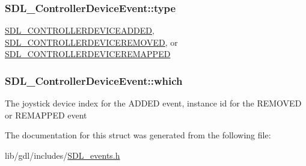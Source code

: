 \subsubsection[{type}]{ S\+D\+L\+\_\+\+Controller\+Device\+Event\+::type}\label{struct_s_d_l___controller_device_event_a45b3807eaf70a5f5cf712455da277536}
\hyperlink{_s_d_l__events_8h_a3b589e89be6b35c02e0dd34a55f3fccaa9642de478348da1aba4fb5791e8c5314}{S\+D\+L\+\_\+\+C\+O\+N\+T\+R\+O\+L\+L\+E\+R\+D\+E\+V\+I\+C\+E\+A\+D\+D\+E\+D}, \hyperlink{_s_d_l__events_8h_a3b589e89be6b35c02e0dd34a55f3fccaae00ac6995dfb7b92bfae68b9f47ae07a}{S\+D\+L\+\_\+\+C\+O\+N\+T\+R\+O\+L\+L\+E\+R\+D\+E\+V\+I\+C\+E\+R\+E\+M\+O\+V\+E\+D}, or \hyperlink{_s_d_l__events_8h_a3b589e89be6b35c02e0dd34a55f3fccaaeca87c7b5bb21915d444298449a78ee6}{S\+D\+L\+\_\+\+C\+O\+N\+T\+R\+O\+L\+L\+E\+R\+D\+E\+V\+I\+C\+E\+R\+E\+M\+A\+P\+P\+E\+D} \hypertarget{struct_s_d_l___controller_device_event_accb80de1619c1e790cffb6c888c915db}{}
\subsubsection[{which}]{ S\+D\+L\+\_\+\+Controller\+Device\+Event\+::which}\label{struct_s_d_l___controller_device_event_accb80de1619c1e790cffb6c888c915db}
The joystick device index for the A\+D\+D\+E\+D event, instance id for the R\+E\+M\+O\+V\+E\+D or R\+E\+M\+A\+P\+P\+E\+D event 

The documentation for this struct was generated from the following file\+:\begin{DoxyCompactItemize}
\item 
lib/gdl/includes/\hyperlink{_s_d_l__events_8h}{S\+D\+L\+\_\+events.\+h}\end{DoxyCompactItemize}

